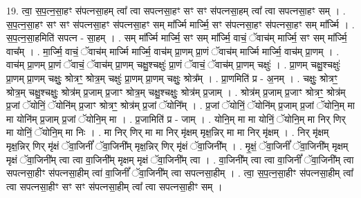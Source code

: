 \documentclass[17pt]{extarticle}
\begin{document}
19. त्वा॒ स॒प॒त्न॒सा॒हꣳ स॑पत्नसा॒हम् त्वा᳚ त्वा सपत्नसा॒हꣳ सꣳ सꣳ स॑पत्नसा॒हम् त्वा᳚ त्वा सपत्नसा॒हꣳ सम् । . स॒प॒त्न॒सा॒हꣳ सꣳ सꣳ स॑पत्नसा॒हꣳ स॑पत्नसा॒हꣳ सम् मा᳚र्ज्मि मार्ज्मि॒ सꣳ स॑पत्नसा॒हꣳ स॑पत्नसा॒हꣳ सम् मा᳚र्ज्मि । . स॒प॒त्न॒सा॒हमिति॑ सपत्न - सा॒हम् । . सम् मा᳚र्ज्मि मार्ज्मि॒ सꣳ सम् मा᳚र्ज्मि॒ वाचं॒ ॅवाच॑म् मार्ज्मि॒ सꣳ सम् मा᳚र्ज्मि॒ वाच᳚म् । . मा॒र्ज्मि॒ वाचं॒ ॅवाच॑म् मार्ज्मि मार्ज्मि॒ वाच॑म् प्रा॒णम् प्रा॒णं ॅवाच॑म् मार्ज्मि मार्ज्मि॒ वाच॑म् प्रा॒णम् । . वाच॑म् प्रा॒णम् प्रा॒णं ॅवाचं॒ ॅवाच॑म् प्रा॒णम् चक्षु॒श्चक्षुः॑ प्रा॒णं ॅवाचं॒ ॅवाच॑म् प्रा॒णम् चक्षुः॑ । . प्रा॒णम् चक्षु॒श्चक्षुः॑ प्रा॒णम् प्रा॒णम् चक्षुः॒ श्रोत्रꣳ॒॒ श्रोत्र॒म् चक्षुः॑ प्रा॒णम् प्रा॒णम् चक्षुः॒ श्रोत्र᳚म् । . प्रा॒णमिति॑ प्र - अ॒नम् । . चक्षुः॒ श्रोत्रꣳ॒॒ श्रोत्र॒म् चक्षु॒श्चक्षुः॒ श्रोत्र॑म् प्र॒जाम् प्र॒जाꣳ श्रोत्र॒म् चक्षु॒श्चक्षुः॒ श्रोत्र॑म् प्र॒जाम् । . श्रोत्र॑म् प्र॒जाम् प्र॒जाꣳ श्रोत्रꣳ॒॒ श्रोत्र॑म् प्र॒जां ॅयोनिं॒ ॅयोनि॑म् प्र॒जाꣳ श्रोत्रꣳ॒॒ श्रोत्र॑म् प्र॒जां ॅयोनि᳚म् । . प्र॒जां ॅयोनिं॒ ॅयोनि॑म् प्र॒जाम् प्र॒जां ॅयोनि॒म् मा मा योनि॑म् प्र॒जाम् प्र॒जां ॅयोनि॒म् मा । . प्र॒जामिति॑ प्र - जाम् । . योनि॒म् मा मा योनिं॒ ॅयोनि॒म् मा निर् णिर् मा योनिं॒ ॅयोनि॒म् मा निः । . मा निर् णिर् मा मा निर् मृ॑क्षम् मृक्ष॒न्निर् मा मा निर् मृ॑क्षम् । . निर् मृ॑क्षम् मृक्ष॒न्निर् णिर् मृ॑क्षं ॅवा॒जिनीं᳚ ॅवा॒जिनी᳚म् मृक्ष॒न्निर् णिर् मृ॑क्षं ॅवा॒जिनी᳚म् । . मृ॒क्षं॒ ॅवा॒जिनीं᳚ ॅवा॒जिनी᳚म् मृक्षम् मृक्षं ॅवा॒जिनी᳚म् त्वा त्वा वा॒जिनी᳚म् मृक्षम् मृक्षं ॅवा॒जिनी᳚म् त्वा । . वा॒जिनी᳚म् त्वा त्वा वा॒जिनीं᳚ ॅवा॒जिनी᳚म् त्वा सपत्नसा॒हीꣳ स॑पत्नसा॒हीम् त्वा॑ वा॒जिनीं᳚ ॅवा॒जिनी᳚म् त्वा सपत्नसा॒हीम् । . त्वा॒ स॒प॒त्न॒सा॒हीꣳ स॑पत्नसा॒हीम् त्वा᳚ त्वा सपत्नसा॒हीꣳ सꣳ सꣳ स॑पत्नसा॒हीम् त्वा᳚ त्वा सपत्नसा॒हीꣳ सम् । \newline
\end{document}
